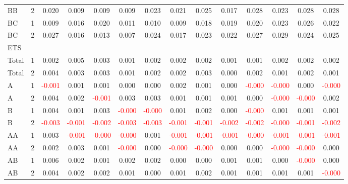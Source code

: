 \begin{table}[!htb]
{\begin{tabular}{llcccccccccccc}
BB & 2 & 0.020 & 0.009 & 0.009 & 0.009 & 0.023 & 0.021 & 0.025 & 0.017 & 0.028 & 0.023 & 0.028 & 0.028\\
BC & 1 & 0.009 & 0.016 & 0.020 & 0.011 & 0.010 & 0.009 & 0.018 & 0.019 & 0.020 & 0.023 & 0.026 & 0.022\\
BC & 2 & 0.027 & 0.016 & 0.013 & 0.007 & 0.024 & 0.017 & 0.023 & 0.022 & 0.027 & 0.029 & 0.024 & 0.025\\
\hline
ETS &  &  &  &  &  &  &  &  &  &  &  &  & \\
\hline
Total & 1 & 0.002 & 0.005 & 0.003 & 0.001 & 0.002 & 0.002 & 0.002 & 0.001 & 0.001 & 0.002 & 0.002 & 0.002\\
Total & 2 & 0.004 & 0.003 & 0.003 & 0.001 & 0.002 & 0.002 & 0.003 & 0.000 & 0.002 & 0.001 & 0.002 & 0.001\\
A & 1 & \textcolor{red}{-0.001} & 0.001 & 0.001 & 0.000 & 0.000 & 0.002 & 0.001 & 0.000 & \textcolor{red}{-0.000} & \textcolor{red}{-0.000} & 0.000 & \textcolor{red}{-0.000}\\
A & 2 & 0.004 & 0.002 & \textcolor{red}{-0.001} & 0.003 & 0.003 & 0.001 & 0.001 & 0.001 & 0.000 & \textcolor{red}{-0.000} & \textcolor{red}{-0.000} & 0.002\\
B & 1 & 0.004 & 0.001 & 0.003 & \textcolor{red}{-0.000} & \textcolor{red}{-0.000} & 0.001 & 0.002 & 0.000 & \textcolor{red}{-0.000} & 0.001 & 0.001 & 0.001\\
B & 2 & \textcolor{red}{-0.003} & \textcolor{red}{-0.001} & \textcolor{red}{-0.002} & \textcolor{red}{-0.003} & \textcolor{red}{-0.003} & \textcolor{red}{-0.001} & \textcolor{red}{-0.001} & \textcolor{red}{-0.002} & \textcolor{red}{-0.002} & \textcolor{red}{-0.000} & \textcolor{red}{-0.001} & \textcolor{red}{-0.002}\\
AA & 1 & 0.003 & \textcolor{red}{-0.001} & \textcolor{red}{-0.000} & \textcolor{red}{-0.000} & 0.001 & \textcolor{red}{-0.001} & \textcolor{red}{-0.001} & \textcolor{red}{-0.001} & \textcolor{red}{-0.000} & \textcolor{red}{-0.001} & \textcolor{red}{-0.001} & \textcolor{red}{-0.001}\\
AA & 2 & 0.002 & 0.003 & 0.001 & \textcolor{red}{-0.000} & 0.000 & \textcolor{red}{-0.000} & \textcolor{red}{-0.000} & 0.000 & 0.000 & \textcolor{red}{-0.000} & \textcolor{red}{-0.000} & 0.000\\
AB & 1 & 0.006 & 0.002 & 0.001 & 0.002 & 0.002 & 0.000 & 0.000 & 0.001 & 0.001 & 0.000 & \textcolor{red}{-0.000} & 0.000\\
AB & 2 & 0.004 & 0.002 & 0.002 & 0.001 & 0.000 & 0.001 & 0.002 & 0.001 & 0.001 & 0.001 & 0.001 & \textcolor{red}{-0.000}\\

\end{tabular}}
\end{table}

